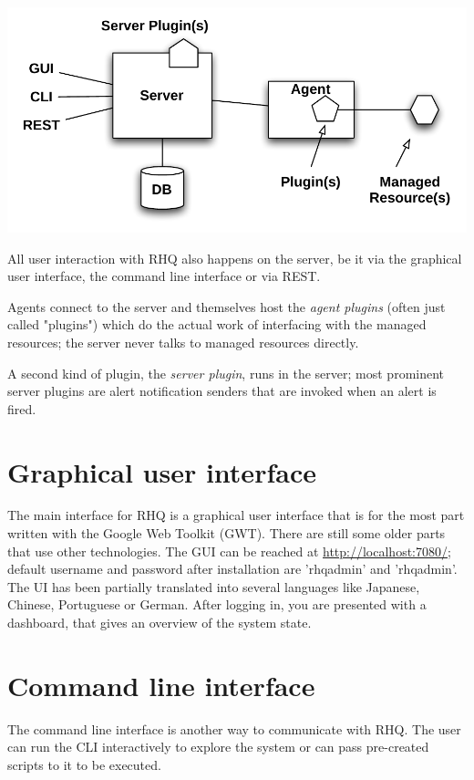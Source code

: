 \documentclass[twocolumn,10pt,a4paper]{article}
\begin{document}
\noindent\includegraphics[width=\columnwidth]{graph/arch.pdf}

All user interaction with RHQ also happens on the server, be it via the graphical
user interface, the command line interface or via REST. 

Agents connect to the server and themselves host the \emph{agent plugins} (often
just called "plugins") which do the actual work of interfacing with the managed
resources; the server never talks to managed resources directly.

A second kind of plugin, the \emph{server plugin}, runs in the server; most
prominent server plugins are alert notification senders that are invoked when an
alert is fired.

\section{Graphical user interface}

The main interface for RHQ is a graphical user interface that is for the most part
written with the Google Web Toolkit (GWT). There are still some older parts that use other
technologies. The GUI can be reached at \url{http://localhost:7080/}; default
username and password after installation are 'rhqadmin' and 'rhqadmin'. The UI
has been partially translated into several languages like Japanese, Chinese, Portuguese or German. After logging in, you are presented with a dashboard, that gives an
overview of the system state.

\section{Command line interface}

The command line interface is another way to communicate with RHQ. The user can run the CLI interactively to explore the system or can pass pre-created scripts to it to be executed.
\end{document}
